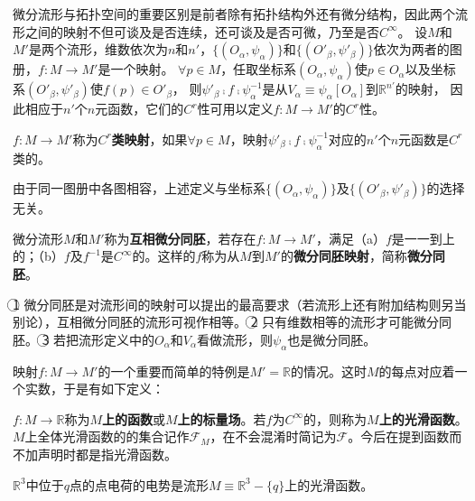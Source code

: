 微分流形与拓扑空间的重要区别是前者除有拓扑结构外还有微分结构，因此两个流形之间的映射不但可谈及是否连续，还可谈及是否可微，乃至是否$C^\infty$。
设$M$和$M'$是两个流形，维数依次为$n$和$n'$，$\{(O_\alpha, \psi_\alpha)\}$和$\{(O'_\beta, \psi'_\beta)\}$依次为两者的图册，$f \colon M \to M'$是一个映射。
$\forall p \in M$，任取坐标系$(O_\alpha, \psi_\alpha)$使$p \in O_\alpha$以及坐标系$(O'_\beta, \psi'_\beta)$使$f(p) \in O'_\beta$，
则$\psi'_\beta \comp f \comp \psi_\alpha^{-1}$是从$V_\alpha \equiv \psi_\alpha[O_\alpha]$到$\mathbb{R}^{n'}$的映射，
因此相应于$n'$个$n$元函数，它们的$C^r$性可用以定义$f \colon M \to M'$的$C^r$性。

\begin{definition}
$f \colon M \to M'$称为\textbf{$C^r$类映射}，如果$\forall p \in M$，映射$\psi'_\beta \comp f \comp \psi_\alpha^{-1}$对应的$n'$个$n$元函数是$C^r$类的。
\end{definition}

\begin{note}
由于同一图册中各图相容，上述定义与坐标系$\{(O_\alpha, \psi_\alpha)\}$及$\{(O'_\beta, \psi'_\beta)\}$的选择无关。
\end{note}

\begin{definition}
微分流形$M$和$M'$称为\textbf{互相微分同胚}，若存在$f \colon M \to M'$，满足（a）$f$是一一到上的；（b）$f$及$f^{-1}$是$C^\infty$的。这样的$f$称为从$M$到$M'$的\textbf{微分同胚映射}，简称\textbf{微分同胚}。
\end{definition}

\begin{note}
\textcircled{1} 微分同胚是对流形间的映射可以提出的最高要求（若流形上还有附加结构则另当别论），互相微分同胚的流形可视作相等。
\textcircled{2} 只有维数相等的流形才可能微分同胚。
\textcircled{3} 若把流形定义中的$O_\alpha$和$V_\alpha$看做流形，则$\psi_\alpha$也是微分同胚。
\end{note}

映射$f \colon M \to M'$的一个重要而简单的特例是$M' = \mathbb{R}$的情况。这时$M$的每点对应着一个实数，于是有如下定义：

\begin{definition}
$f \colon M \to \mathbb{R}$称为\textbf{$M$上的函数}或\textbf{$M$上的标量场}。若$f$为$C^\infty$的，则称为\textbf{$M$上的光滑函数}。
$M$上全体光滑函数的的集合记作$\mathscr{F}_M$，在不会混淆时简记为$\mathscr{F}$。今后在提到函数而不加声明时都是指光滑函数。
\end{definition}

\begin{example}
$\mathbb{R}^3$中位于$q$点的点电荷的电势是流形$M \equiv \mathbb{R}^3 - \{q\}$上的光滑函数。
\end{example}

